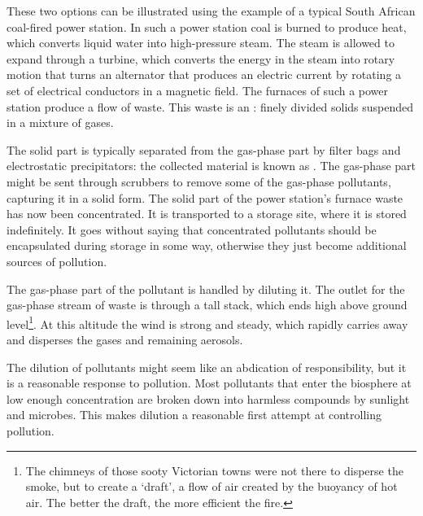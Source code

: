 
These two options can be illustrated using the example of a typical South
African coal-fired power station. In such a power station coal is burned to
produce heat, which converts liquid water into high-pressure steam. The steam is
allowed to expand through a turbine, which converts the energy in the steam into
rotary motion that turns an alternator that produces an electric current by
rotating a set of electrical conductors in a magnetic field. The furnaces of
such a power station produce a flow of waste. This waste is an
: finely divided solids suspended in a mixture of gases.

The solid part is typically separated from the gas-phase part by filter bags and
electrostatic precipitators: the collected material is known as . The gas-phase part might be sent through scrubbers to remove some of the
gas-phase pollutants, capturing it in a solid form. The solid part of the power
station's furnace waste has now been concentrated. It is transported to a
storage site, where it is stored indefinitely. It goes without saying that
concentrated pollutants should be encapsulated during storage in some way,
otherwise they just become additional sources of pollution.

The gas-phase part of the pollutant is handled by diluting it. The outlet for
the gas-phase stream of waste is through a tall stack, which ends high above
ground level\footnote{The chimneys of those sooty Victorian towns were not there
to disperse the smoke, but to create a `draft', a flow of air created by the
buoyancy of hot air. The better the draft, the more efficient the fire.}. At
this altitude the wind is strong and steady, which rapidly carries away and
disperses the gases and remaining aerosols.

The dilution of pollutants might seem like an abdication of responsibility, but
it is a reasonable response to pollution. Most pollutants that enter the
biosphere at low enough concentration are broken down into harmless compounds by
sunlight and microbes. This makes dilution a reasonable first attempt at
controlling pollution.

